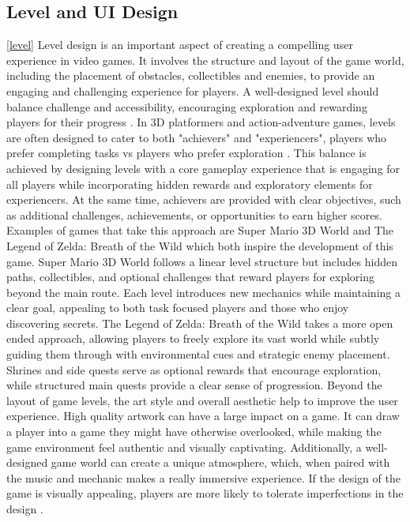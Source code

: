 \documentclass[10pt]{final_report}
\begin{document}
\subsection{Level and UI Design}\ref{level}
Level design is an important aspect of creating a compelling user experience in video games. It involves the structure and layout of the game world, including the placement of obstacles, collectibles and enemies, to provide an engaging and challenging experience for players. A well-designed level should balance challenge and accessibility, encouraging exploration and rewarding players for their progress \cite{Kramarzewski2023}. In 3D platformers and action-adventure games, levels are often designed to cater to both "achievers" and "experiencers", players who prefer completing tasks vs players who prefer exploration \cite{zhao2022dynamic}. This balance is achieved by designing levels with a core gameplay experience that is engaging for all players while incorporating hidden rewards and exploratory elements for experiencers. At the same time, achievers are provided with clear objectives, such as additional challenges, achievements, or opportunities to earn higher scores. 
\newline
Examples of games that take this approach are Super Mario 3D World and The Legend of Zelda: Breath of the Wild which both inspire the development of this game. Super Mario 3D World follows a linear level structure but includes hidden paths, collectibles, and optional challenges that reward players for exploring beyond the main route. Each level introduces new mechanics while maintaining a clear goal, appealing to both task focused players and those who enjoy discovering secrets.
The Legend of Zelda: Breath of the Wild takes a more open ended approach, allowing players to freely explore its vast world while subtly guiding them through with environmental cues and strategic enemy placement. Shrines and side quests serve as optional rewards that encourage exploration, while structured main quests provide a clear sense of progression.
\newline
Beyond the layout of game levels, the art style and overall aesthetic help to improve the user experience. High quality artwork can have a large impact on a game. It can draw a player into a game they might have otherwise overlooked, while making the game environment feel authentic and visually captivating. Additionally, a well-designed game world can create a unique atmosphere, which, when paired with the music and mechanic makes a really immersive experience. If the design of the game is visually appealing, players are more likely to tolerate imperfections in the design \cite{Jesse2019}.
\end{document}
